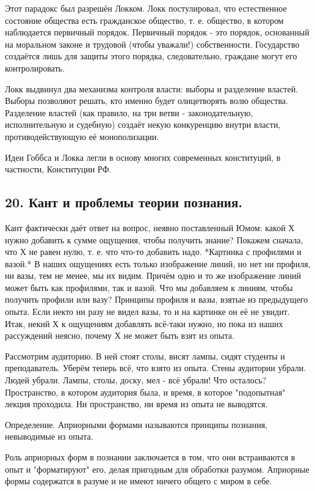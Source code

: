 \documentclass[a4paper, 12pt]{article}
\begin{document}
Этот парадокс был разрешён Локком.
Локк постулировал, что естественное состояние общества есть гражданское общество, т. е. общество, в котором наблюдается первичный порядок.
Первичный порядок - это порядок, основанный на моральном законе и трудовой (чтобы уважали!) собственности.
Государство создаётся лишь для защиты этого порядка, следовательно, граждане могут его контролировать.

Локк выдвинул два механизма контроля власти: выборы и разделение властей.
Выборы позволяют решать, кто именно будет олицетворять волю общества.
Разделение властей (как правило, на три ветви - законодательную, исполнительную и судебную) создаёт некую конкуренцию внутри власти, противодействующую её монополизации.

Идеи Гоббса и Локка легли в основу многих современных конституций, в частности, Конституции РФ.


\subsection*{\textbf{20. Кант и проблемы теории познания.}}

Кант фактически даёт ответ на вопрос, неявно поставленный Юмом: какой Х нужно добавить к сумме ощущения, чтобы получить знание?
Покажем сначала, что Х не равен нулю, т. е. что что-то добавить надо.
*Картинка с профилями и вазой.*
В наших ощущениях есть только изображение линий, но нет ни профиля, ни вазы, тем не менее, мы их видим.
Причём одно и то же изображение линий может быть как профилями, так и вазой.
Что мы добавляем к линиям, чтобы получить профили или вазу?
Принципы профиля и вазы, взятые из предыдущего опыта.
Если некто ни разу не видел вазы, то и на картинке он её не увидит.
Итак, некий Х к ощущениям добавлять всё-таки нужно, но пока из наших рассуждений неясно, почему Х не может быть взят из опыта.

Рассмотрим аудиторию.
В ней стоят столы, висят лампы, сидят студенты и преподаватель.
Уберём теперь всё, что взято из опыта.
Стены аудитории убрали. Людей убрали. Лампы, столы, доску, мел - всё убрали!
Что осталось? Пространство, в котором аудитория была, и время, в которое "подопытная" лекция проходила.
Ни пространство, ни время из опыта не выводятся.

Определение. Априорными формами называются принципы познания, невыводимые из опыта.

Роль априорных форм в познании заключается в том, что они встраиваются в опыт и "форматируют" его, делая пригодным для обработки разумом.
Априорные формы содержатся в разуме и не имеют ничего общего с миром в себе.
\end{document}
